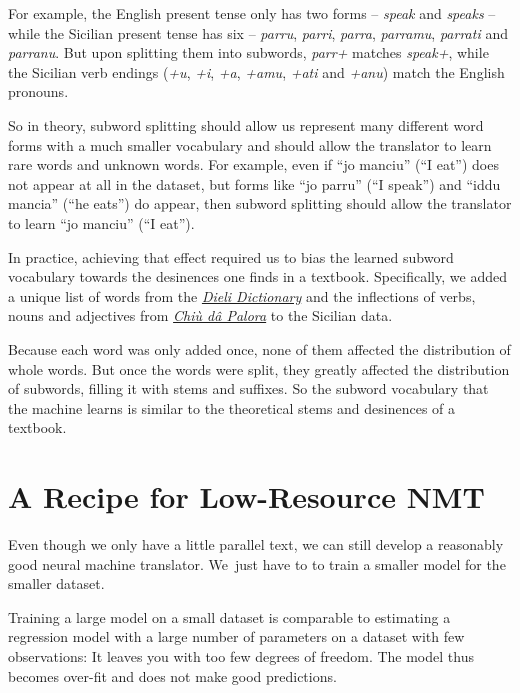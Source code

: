 \documentclass[10pt,letterpaper]{article}
\begin{document}
For example, the English present tense only has two forms -- \textit{speak} and \textit{speaks} -- 
while the Sicilian present tense has six -- \textit{parru}, \textit{parri}, \textit{parra}, 
\textit{parramu}, \textit{parrati} and \textit{parranu}. 
But upon splitting them into subwords, \textit{parr+} matches \textit{speak+},
while the Sicilian verb endings
(\textit{+u}, \textit{+i}, \textit{+a}, \textit{+amu}, \textit{+ati} and \textit{+anu})
match the English pronouns.

So in theory, subword splitting should allow us represent many different word forms with a much smaller vocabulary
and should allow the translator to learn rare words and unknown words.
For example, even if ``jo manciu'' (``I eat'') does not appear at all in the dataset,
but forms like ``jo parru'' (``I speak'') and ``iddu mancia'' (``he eats'') do appear,
then subword splitting should allow the translator to learn ``jo manciu'' (``I eat'').

In practice, achieving that effect required us to bias the learned subword vocabulary towards
the desinences one finds in a textbook. Specifically, we added a unique list of words from the
\href{https://www.napizia.com/cgi-bin/sicilian.pl}{\textit{Dieli Dictionary}}
and the inflections of verbs, nouns and adjectives from
\href{https://www.napizia.com/cgi-bin/cchiu-da-palora.pl}{\textit{Chiù dâ Palora}}
to the Sicilian data.

Because each word was only added once, none of them affected the distribution of whole words.
But once the words were split, they greatly affected the distribution of subwords, filling it with stems and suffixes.
So the subword vocabulary that the machine learns is similar to the theoretical stems and desinences of a textbook.



\hypertarget{recipe}{}

\section*{A Recipe for Low-Resource NMT}

Even though we only have a little parallel text, we can still 
develop a reasonably good neural machine translator.
We~just have to to train a smaller model for the smaller dataset.
      
Training a large model on a small dataset is comparable to estimating a regression
model with a large number of parameters on a dataset with few observations: 
It leaves you with too few degrees of freedom.
The model thus becomes over-fit and does not make good predictions.
      
\end{document}
